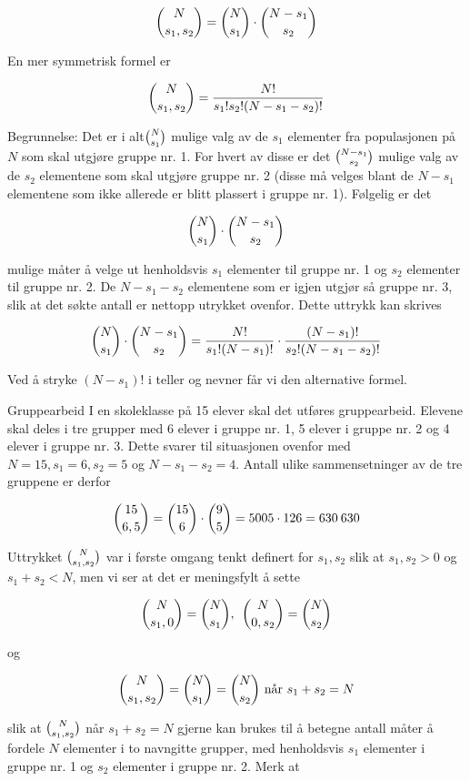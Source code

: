 \[{{N}\choose{s_1,s_2}}={{N}\choose{s_1}}\cdot {{N-s_1}\choose{s_2}} \]

\noindent En mer symmetrisk formel er

\[{{N}\choose{s_1,s_2}}=\frac{N!}{s_1!s_2!(N-s_1-s_2)!} \]

\noindent Begrunnelse: Det er i alt${{N}\choose{s_1}}$ mulige valg av de $s_1$
elementer fra populasjonen på $N$ som skal utgjøre gruppe nr. 1.
For hvert av disse er det ${{N-s_1}\choose{s_2}}$ mulige valg av de $s_2$
elementene som skal utgjøre gruppe nr. 2 (disse må velges blant
de $N-s_1$ elementene som ikke allerede er blitt plassert i
gruppe nr. 1). Følgelig er det

\[ {{N}\choose{s_1}} \cdot {{N-s_1}\choose{s_2}} \]

\noindent mulige måter å velge ut henholdsvis $s_1$ elementer til
 gruppe nr. 1 og $s_2$ elementer til gruppe nr. 2. De $N-s_1-s_2$ elementene
som er igjen utgjør så gruppe nr. 3, slik at det søkte antall er
nettopp utrykket ovenfor. Dette uttrykk kan skrives

\[ {{N}\choose{s_1}}\cdot {{N-s_1}\choose{s_2}}=\frac{N!}{s_1!(N-s_1)!}
                             \cdot \frac{(N-s_1)!}{s_2!(N-s_1-s_2)!} \]

\noindent Ved å stryke $(N-s_1)$! i teller og nevner får vi den alternative formel.\\

\begin{eksempel}{Gruppearbeid}
I en skoleklasse på 15 elever skal det utføres gruppearbeid.
Elevene skal deles i tre grupper med 6 elever i gruppe nr. 1, 5
elever i gruppe nr. 2 og 4 elever i gruppe nr. 3. Dette svarer
til situasjonen ovenfor med $N=15, s_1=6,s_2=5$ og $N-s_1-s_2=4$.
Antall ulike sammensetninger av de tre gruppene er derfor

\[ {{15}\choose{6,5}}={{15}\choose{6}}\cdot {{9}\choose{5}}=5005 \cdot 126=630\: 630 \]
\end{eksempel}
\noindent Uttrykket ${{N}\choose{s_1,s_2}}$ var i første omgang tenkt definert
 for $s_1,s_2$ slik at $s_1, s_2>0$ og $s_1+s_2<N$, men vi ser at det er
meningsfylt å sette 

\[ {{N}\choose{s_1,0}}= {{N}\choose{s_1}},\: \: {{N}\choose{0,s_2}}={{N}\choose{s_2}} \]

\noindent og

\[ {{N}\choose{s_1,s_2}}= {{N}\choose{s_1}}= {{N}\choose{s_2}}
                                     \mbox{ når  } s_1+s_2=N \]

\noindent slik at ${{N}\choose{s_1,s_2}}$ når $s_1+s_2=N$ gjerne kan brukes til å
 betegne antall måter å fordele $N$ elementer i to navngitte grupper,
 med henholdsvis $s_1$ elementer i gruppe nr. 1 og $s_2$ elementer i
gruppe nr. 2. Merk at

